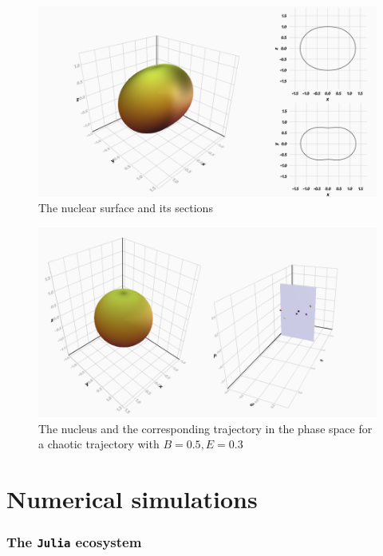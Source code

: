 \documentclass{beamer}
\begin{document}
\begin{frame}
	\begin{figure}
		\includegraphics[width=\textwidth]{nucleus-with-sections}
		\caption{The nuclear surface and its sections}
	\end{figure}
\end{frame}


\begin{frame}
	\begin{figure}
		\includegraphics[width=\textwidth]{nucleus-with-poincare}
		\caption{The nucleus and the corresponding trajectory in the phase space
		for a chaotic trajectory with \(B=0.5, E=0.3\)}
	\end{figure}
\end{frame}

\section{Numerical simulations}

\subsubsection{The \texttt{Julia} ecosystem}
\end{document}
